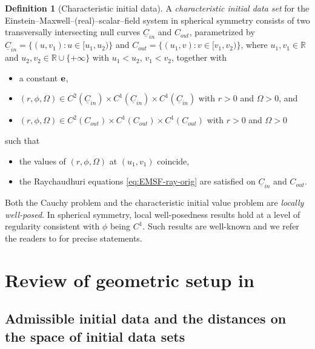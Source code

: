 \documentclass[10pt, reqno]{amsart}
\theoremstyle{definition}
\newtheorem{definition}[theorem]{Definition}
\theoremstyle{remark}
\theoremstyle{conjecture}
\numberwithin{equation}{section}
\newcommand{\0}{\emptyset}
\newcommand{\Omg}{\Omega}
\newcommand{\bfe}{{\bf e}}
\newcommand{\uC}{\underline{C}}
\newcommand{\e}{\bfe}							%
\begin{document}
\begin{definition}[Characteristic initial data]\label{def.CID}
A \emph{characteristic initial data set} for the Einstein--Maxwell--(real)--scalar--field system in spherical symmetry consists of two transversally intersecting null curves $\uC_{in}$ and $C_{out}$, parametrized by $\uC_{in}=\{(u, v_1): u\in [u_1, u_2 )\}$ and $C_{out}=\{(u_1, v): v\in [v_1, v_2 )\}$, where $u_1, v_1\in \mathbb R$ and $u_2, v_2\in \mathbb R\cup\{+\infty\}$ with $u_1<u_2$, $v_1<v_2$, together with
\begin{itemize}
\item a constant $\e$,
\item $(r,\phi,\Omg)\in C^2(\uC_{in})\times C^1(\uC_{in})\times C^1(\uC_{in})$ with $r>0$ and $\Omg>0$, and
\item $(r,\phi,\Omg)\in C^2(C_{out})\times C^1(C_{out})\times C^1(C_{out})$ with $r>0$ and $\Omg>0$
\end{itemize}
such that
\begin{itemize}
\item the values of $(r,\phi,\Omg)$ at $(u_1, v_1)$ coincide,
\item the Raychaudhuri equations \eqref{eq:EMSF-ray-orig} are satisfied on $\uC_{in}$ and $C_{out}$.
\end{itemize}
\end{definition}


Both the Cauchy problem and the characteristic initial value problem are \emph{locally well-posed}. In spherical symmetry, local well-posedness results hold at a level of regularity consistent with $\phi$ being $C^1$. Such results are well-known and we refer the readers to \cite{LO.interior} for precise statements.

\section{Review of geometric setup in \cite{LO.interior}}\label{sec.review}

\subsection{Admissible initial data and the distances on the space of initial data sets}\label{sec.review.basic}
\end{document}
